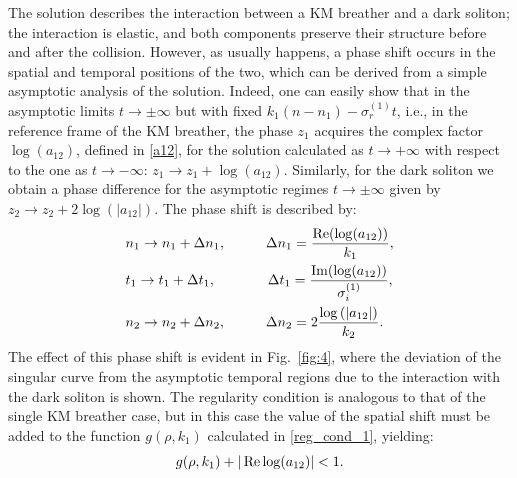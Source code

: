 \documentclass{article}
\def\Re{\mathop{\rm Re}\nolimits}
\def\Im{\mathop{\rm Im}\nolimits}
\begin{document}
The solution describes the interaction between a KM breather and a dark soliton; the interaction is elastic, and both components preserve their structure before and after the collision. However, as usually happens, a phase shift occurs in the spatial and temporal positions of the two, which can be derived from a simple asymptotic analysis of the solution. Indeed, one can easily show that in the asymptotic limits $t\rightarrow\pm\infty$ but with fixed $k_1(n-n_1)-\sigma_r^{(1)} t$, i.e., in the reference frame of the KM breather, the phase $z_1$ acquires the complex factor $\log (a_{12})$, defined in \eqref{a12}, for the solution calculated as $t\to +\infty$ with respect to the one as $t\to -\infty$: $z_1\rightarrow z_1+\log(a_{12})$. Similarly, for the dark soliton we obtain a phase difference for the asymptotic regimes $t\to \pm\infty$ given by $z_2\rightarrow z_2+2\log(|a_{12}|)$. The phase shift is described by:
\begin{equation}\label{km-dark-shift}
    \begin{split}
        &n_1\rightarrow n_1+\Delta n_1,  \hspace{1cm}\Delta n_1=\frac{\Re(\log(a_{12}))}{k_1},\\
        &t_1\rightarrow t_1+\Delta t_1,  \hspace{1.3cm}\Delta t_1=\frac{\Im(\log(a_{12}))}{\sigma_i^{(1)}},\\
       & n_2\rightarrow n_2+\Delta n_2,\hspace{1cm}\Delta n_2=2\frac{\log\left(|a_{12}|\right)}{k_2}.
    \end{split}
\end{equation}
The effect of this phase shift is evident in Fig.~\ref{fig:4}, where the deviation of the singular curve from the asymptotic temporal regions due to the interaction with the dark soliton is shown. The regularity condition is analogous to that of the single KM breather case, but in this case the value of the spatial shift must be added to the function $g(\rho,k_1)$ calculated in \eqref{reg_cond_1}, yielding:
 \begin{equation}
     g(\rho,k_1)+|\Re\log(a_{12})|<1.
 \end{equation}
\end{document}
